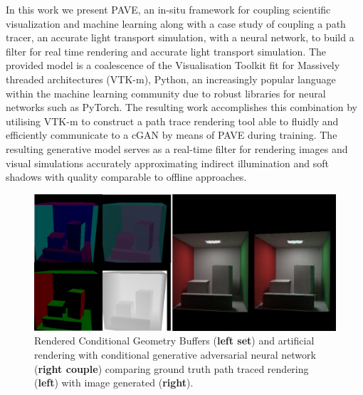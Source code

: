 In this work we present PAVE, an in-situ framework for coupling scientific visualization and machine learning along with a case study of coupling a path tracer, an accurate light transport simulation, with a neural network, to build a filter for real time rendering and accurate light transport simulation. The provided model is a coalescence of the Visualisation Toolkit fit for Massively threaded architectures (VTK-m), Python, an increasingly popular language within the machine learning community due to robust libraries for neural networks such as PyTorch. The resulting work accomplishes this combination by utilising VTK-m to construct a path trace rendering tool able to fluidly and efficiently communicate to a cGAN by means of PAVE during training.   The resulting generative model serves as a real-time filter for rendering images and visual simulations accurately approximating indirect illumination and soft shadows with quality comparable to offline approaches. 

\begin{figure}
    \includegraphics[width=\linewidth]{buffer_results_teaser}
    \caption{Rendered Conditional Geometry Buffers ({\bf left set}) and artificial rendering with conditional generative adversarial neural network ({\bf right couple}) comparing ground truth path traced rendering ({\bf left}) with image generated ({\bf right}).}
  \end{figure}
